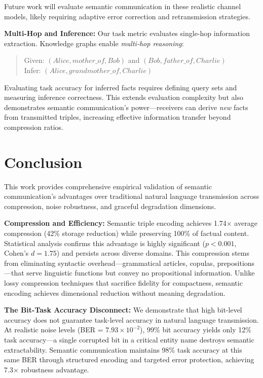 \documentclass[conference]{IEEEtran}
\begin{document}
Future work will evaluate semantic communication in these realistic channel 
models, likely requiring adaptive error correction and retransmission 
strategies.

\textbf{Multi-Hop and Inference:} Our task metric evaluates single-hop 
information extraction. Knowledge graphs enable \textit{multi-hop reasoning}:

\begin{quote}
Given: $(Alice, mother\_of, Bob)$ and $(Bob, father\_of, Charlie)$\\
Infer: $(Alice, grandmother\_of, Charlie)$
\end{quote}

Evaluating task accuracy for inferred facts requires defining query sets 
and measuring inference correctness. This extends evaluation complexity 
but also demonstrates semantic communication's power—receivers can derive 
\textit{new} facts from transmitted triples, increasing effective information 
transfer beyond compression ratios.

\section{Conclusion}

This work provides comprehensive empirical validation of semantic communication's 
advantages over traditional natural language transmission across compression, 
noise robustness, and graceful degradation dimensions.

\textbf{Compression and Efficiency:} Semantic triple encoding achieves 
1.74× average compression (42\% storage reduction) while preserving 100\% 
of factual content. Statistical analysis confirms this advantage is highly 
significant ($p < 0.001$, Cohen's $d = 1.75$) and persists across diverse 
domains. This compression stems from eliminating syntactic overhead—grammatical 
articles, copulas, prepositions—that serve linguistic functions but convey 
no propositional information. Unlike lossy compression techniques that 
sacrifice fidelity for compactness, semantic encoding achieves dimensional 
reduction without meaning degradation.

\textbf{The Bit-Task Accuracy Disconnect:} We demonstrate that high bit-level 
accuracy does not guarantee task-level accuracy in natural language transmission. 
At realistic noise levels (BER = $7.93 \times 10^{-2}$), 99\% bit accuracy 
yields only 12\% task accuracy—a single corrupted bit in a critical entity 
name destroys semantic extractability. Semantic communication maintains 
98\% task accuracy at this same BER through structured encoding and targeted 
error protection, achieving 7.3× robustness advantage.
\end{document}
